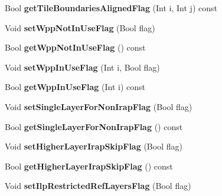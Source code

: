 \begin{DoxyCompactItemize}
\item 
\mbox{\label{class_t_com_v_p_s_v_u_i_a362ac1940550eda92c51890c169e21d8}} 
Bool {\bfseries get\+Tile\+Boundaries\+Aligned\+Flag} (Int i, Int j) const
\item 
\mbox{\label{class_t_com_v_p_s_v_u_i_a8adc3d64df0e9ad3eacd539600abbfe5}} 
Void {\bfseries set\+Wpp\+Not\+In\+Use\+Flag} (Bool flag)
\item 
\mbox{\label{class_t_com_v_p_s_v_u_i_abad449837eb2bd2923307280583b9dcd}} 
Bool {\bfseries get\+Wpp\+Not\+In\+Use\+Flag} () const
\item 
\mbox{\label{class_t_com_v_p_s_v_u_i_a934e892bb5755cd6340a93e4f9de6bb6}} 
Void {\bfseries set\+Wpp\+In\+Use\+Flag} (Int i, Bool flag)
\item 
\mbox{\label{class_t_com_v_p_s_v_u_i_ae7581d6085590cb22321d3b04a00d29b}} 
Bool {\bfseries get\+Wpp\+In\+Use\+Flag} (Int i) const
\item 
\mbox{\label{class_t_com_v_p_s_v_u_i_a2ffb39f9a815cc2f9034d4f188a35f33}} 
Void {\bfseries set\+Single\+Layer\+For\+Non\+Irap\+Flag} (Bool flag)
\item 
\mbox{\label{class_t_com_v_p_s_v_u_i_a769062e7ff48913f6f337d6ba884108d}} 
Bool {\bfseries get\+Single\+Layer\+For\+Non\+Irap\+Flag} () const
\item 
\mbox{\label{class_t_com_v_p_s_v_u_i_a0a11cd2722b434d2c7c49f498c6ddb6a}} 
Void {\bfseries set\+Higher\+Layer\+Irap\+Skip\+Flag} (Bool flag)
\item 
\mbox{\label{class_t_com_v_p_s_v_u_i_a0856a65fd2b5a8bb644945ec00ee5d42}} 
Bool {\bfseries get\+Higher\+Layer\+Irap\+Skip\+Flag} () const
\item 
\mbox{\label{class_t_com_v_p_s_v_u_i_af2df6b43addfd46608e517298ff365e6}} 
Void {\bfseries set\+Ilp\+Restricted\+Ref\+Layers\+Flag} (Bool flag)
\item 

\end{DoxyCompactItemize}
